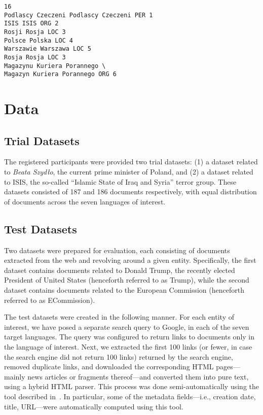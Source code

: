 \documentclass[11pt]{article}
\begin{document}
\begin{small}
\begin{verbatim}
16
Podlascy Czeczeni Podlascy Czeczeni PER 1
ISIS ISIS ORG 2
Rosji Rosja LOC 3
Polsce Polska LOC 4
Warszawie Warszawa LOC 5
Rosja Rosja LOC 3
Magazynu Kuriera Porannego \
Magazyn Kuriera Porannego ORG 6
\end{verbatim}	    
\end{small}

\section{Data}
\label{sec:annotation}

\subsection{Trial Datasets}

The registered participants were provided two trial datasets:
(1) a dataset related to {\em Beata Szydło}, the current prime minister of Poland, and (2)
a dataset related to ISIS, the so-called ``Islamic State of Iraq and Syria'' terror group.
These datasets consisted of 187 and 186 documents respectively, with
equal distribution of documents across the seven languages of interest.

\subsection{Test Datasets}

Two datasets were prepared for evaluation, each consisting of documents
extracted from the web and revolving around a given entity.  Specifically, the
first dataset contains documents related to Donald Trump, the recently elected
President of United States (henceforth referred to as {\sc Trump}), while the
second dataset contains documents related to the European Commission
(henceforth referred to as {\sc ECommission}).

The test datasets were created in the following manner.  For each entity
of interest, we have posed a separate search query to Google, in each of
the seven target languages.  The query was configured to return links to
documents only in the language of interest.  Next, we extracted the first
100 links (or fewer, in case the search engine did not return 100
links) returned by the search engine, removed duplicate links, and
downloaded the corresponding HTML pages---mainly news articles or
fragments thereof---and converted them into pure text, using a hybrid
HTML parser.  This process was done semi-automatically using the tool
described in~\cite{Crawley:ea:2010}.  In particular, some of the metadata
fields---i.e., creation date, title, URL---were automatically computed
using this tool.
\end{document}
